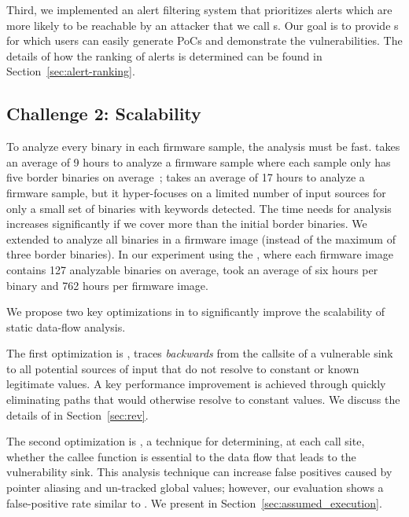 Third, we implemented an alert filtering system that prioritizes alerts which are more likely to be reachable by an attacker that we call \trupoc{}s.
Our goal is to provide \trupoc{}s for which users can easily generate PoCs and demonstrate the vulnerabilities.
The details of how the ranking of alerts is determined can be found in Section~\ref{sec:alert-ranking}.


\subsection{Challenge 2: Scalability}
\label{sec:speed}

To analyze every binary in each firmware sample, the analysis must be fast.
\karonte takes an average of 9 hours to analyze a firmware sample where each sample only has five border binaries on average~\cite{karonte};
\satc takes an average of 17 hours to analyze a firmware sample, but it hyper-focuses on a limited number of input sources for only a small set of binaries with keywords detected.
The time \satc needs for analysis increases significantly if we cover more than the initial border binaries.
We extended \satc to analyze all binaries in a firmware image (instead of the maximum of three border binaries).
In our experiment using the \karonteDataset, where each firmware image contains 127 analyzable binaries on average, \satc took an average of six hours per binary and 762 hours per firmware image.

We propose two key optimizations in \rda to significantly improve the scalability of static data-flow analysis.

The first optimization is \emph{\rev}, traces \emph{backwards} from the callsite of a vulnerable sink to all potential sources of input that do not resolve to constant or known legitimate values.
A key performance improvement is achieved through quickly eliminating paths that would otherwise resolve to constant values.
We discuss the details of \rev in Section~\ref{sec:rev}.

The second optimization is \textit{\assumed}, a technique for determining, at each call site, whether the callee function is essential to the data flow that leads to the vulnerability sink.
This analysis technique can increase false positives caused by pointer aliasing and un-tracked global values; however, our evaluation shows a false-positive rate similar to \satc.
We present \assumed in Section~\ref{sec:assumed_execution}.
